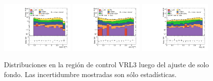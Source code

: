 \begin{figure}[ht!]
\begin{center}
    \includegraphics[width=0.32\textwidth]{images_tmp/results/fr2/can_VRL3_dphi_jetmet_afterFit.pdf}
    \includegraphics[width=0.32\textwidth]{images_tmp/results/fr2/can_VRL3_dphi_gammet_afterFit.pdf}
    \includegraphics[width=0.32\textwidth]{images_tmp/results/fr2/can_VRL3_dphi_gamjet_afterFit.pdf}

    \caption{Distribuciones en la región de control VRL3 luego del ajuste de solo fondo. Las incertidumbre mostradas son sólo estadísticas.}
    \label{fig:dist_vrl3_bkgonly}
  \end{center}
\end{figure}

